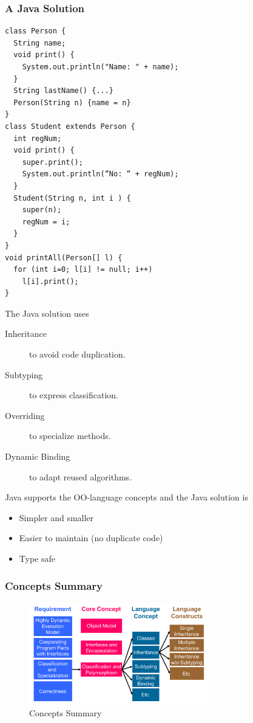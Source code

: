 \subsubsection{A Java Solution}
\lstset{language=Java}
\begin{lstlisting}
class Person {
  String name;
  void print() {
    System.out.println("Name: " + name);
  }
  String lastName() {...}
  Person(String n) {name = n}
}
class Student extends Person {
  int regNum;
  void print() {
    super.print();
    System.out.println(“No: “ + regNum);
  }
  Student(String n, int i ) {
    super(n);
    regNum = i;
  }
}
void printAll(Person[] l) {
  for (int i=0; l[i] != null; i++)
    l[i].print();
}
\end{lstlisting}

The Java solution uses
\begin{description}
 \item[Inheritance] to avoid code duplication.
 \item[Subtyping] to express classification.
 \item[Overriding] to specialize methods.
 \item[Dynamic Binding] to adapt reused algorithms.
\end{description}
Java supports the OO-language concepts and the Java solution is
\begin{itemize}
 \item Simpler and smaller
 \item Easier to maintain (no duplicate code)
 \item Type safe
\end{itemize}

\subsubsection{Concepts Summary}
\begin{figure}[H]
  \centering
    \includegraphics[width=0.7\textwidth]{img/01_concepts_summary}
      \caption{Concepts Summary}
\end{figure}

